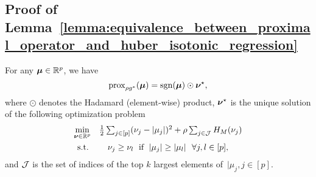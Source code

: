 \subsection{Proof of Lemma~\ref{lemma:equivalence_between_proximal_operator_and_huber_isotonic_regression}}

\begin{namedlemma}
    [~\ref{lemma:equivalence_between_proximal_operator_and_huber_isotonic_regression}]
    For any $\bm{\mu} \in \mathbb{R}^p$, we have 
    $$\operatorname{prox}_{\rho g^*}(\bm{\mu}) = \operatorname{sgn}(\bm{\mu}) \odot \bm{\nu}^\star, $$ 
    where $\odot$ denotes the Hadamard (element-wise) product, $\bm{\nu}^\star$ is the unique solution of the following optimization problem
    \begin{align}
        \label{A:obj:KyFan_Huber_isotonic_regression}
        \begin{array}{cl}
            \min\limits_{\bm{\nu} \in \mathbb{R}^p} & \frac{1}{2} \sum_{j \in [p]} (\nu_j - \lvert \mu_j \rvert)^2 + \rho \sum_{j \in \mathcal{J}} H_M (\nu_j) \\[2ex]
            \operatorname{s.\!t.\!} & \quad \nu_j \geq \nu_l \; \text{ if } \; \lvert \mu_j \rvert \geq \lvert \mu_l \rvert ~~ \forall j, l \in [p],
        \end{array} 
    \end{align}
    and $\mathcal{J}$ is the set of indices of the top $k$ largest elements of~$ \vert{\mu_j}, j \in [p]$. 
\end{namedlemma}

